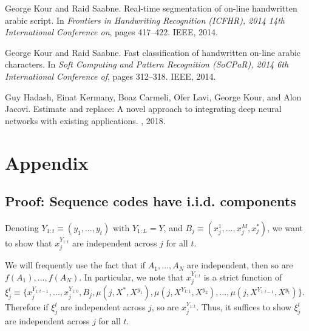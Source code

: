 \documentclass{article}
\begin{document}
  


\begin{thebibliography}{1}

George Kour and Raid Saabne.
\newblock Real-time segmentation of on-line handwritten arabic script.
\newblock In {\em Frontiers in Handwriting Recognition (ICFHR), 2014 14th
  International Conference on}, pages 417--422. IEEE, 2014.

George Kour and Raid Saabne.
\newblock Fast classification of handwritten on-line arabic characters.
\newblock In {\em Soft Computing and Pattern Recognition (SoCPaR), 2014 6th
  International Conference of}, pages 312--318. IEEE, 2014.

Guy Hadash, Einat Kermany, Boaz Carmeli, Ofer Lavi, George Kour, and Alon
  Jacovi.
\newblock Estimate and replace: A novel approach to integrating deep neural
  networks with existing applications.
, 2018.

\end{thebibliography}

\section{Appendix}

\subsection{Proof: Sequence codes have i.i.d. components}

Denoting $Y_{1:t} \equiv (y_1, ..., y_t)$ with $Y_{1:L} = Y$, and $B_j \equiv (x^1_j, ..., x^M_j, x^*_j)$, we want to show that $x_j^{Y_{1:t}}$ are independent across $j$ for all $t$.

We will frequently use the fact that if $A_1, ..., A_N$ are independent, then so are $f(A_1), ..., f(A_N)$. In particular, we note that $x_j^{Y_{1:t}}$ is a strict function of $\xi^t_j \equiv \{x_j^{Y_{1:t-1}}, ..., x_j^{Y_{1:0}}, B_j, \mu(j, X^*, X^{y_1}), \mu(j, X^{Y_{1:1}}, X^{y_2}), ..., \mu(j, X^{Y_{1:t-1}}, X^{y_t})\}.$ Therefore if $\xi^t_j$ are independent across $j$, so are $x_j^{Y_{1:t}}$. Thus, it suffices to show $\xi^t_j$ are independent across $j$ for all $t$.
\end{document}
